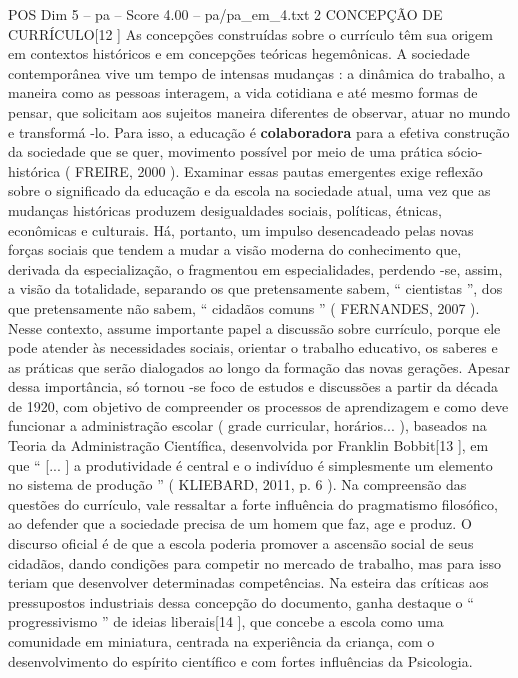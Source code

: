 \begin{textsample}{POS Dim 5 – pa – Score 4.00 – pa/pa\_em\_4.txt}  \label{ex:f5_pos_246}
2 CONCEPÇÃO DE CURRÍCULO[12 ] As concepções construídas sobre o currículo têm sua origem em contextos históricos e em concepções teóricas hegemônicas.
A sociedade contemporânea vive um tempo de intensas mudanças : a dinâmica do trabalho, a maneira como as pessoas interagem, a vida cotidiana e até mesmo formas de pensar, que solicitam aos sujeitos maneira diferentes de observar, atuar no mundo e transformá -lo.
Para isso, a educação é \textbf{colaboradora} para a efetiva construção da sociedade que se quer, movimento possível por meio de uma prática sócio-histórica ( FREIRE, 2000 ).
Examinar essas pautas emergentes exige reflexão sobre o significado da educação e da escola na sociedade atual, uma vez que as mudanças históricas produzem desigualdades sociais, políticas, étnicas, econômicas e culturais.
Há, portanto, um impulso desencadeado pelas novas forças sociais que tendem a mudar a visão moderna do conhecimento que, derivada da especialização, o fragmentou em especialidades, perdendo -se, assim, a visão da totalidade, separando os que pretensamente sabem, “ cientistas ”, dos que pretensamente não sabem, “ cidadãos comuns ” ( FERNANDES, 2007 ).
Nesse contexto, assume importante papel a discussão sobre currículo, porque ele pode atender às necessidades sociais, orientar o trabalho educativo, os saberes e as práticas que serão dialogados ao longo da formação das novas gerações.
Apesar dessa importância, só tornou -se foco de estudos e discussões a partir da década de 1920, com objetivo de compreender os processos de aprendizagem e como deve funcionar a administração escolar ( grade curricular, horários... ), baseados na Teoria da Administração Científica, desenvolvida por Franklin Bobbit[13 ], em que “ [... ] a produtividade é central e o indivíduo é simplesmente um elemento no sistema de produção ” ( KLIEBARD, 2011, p. 6 ).
Na compreensão das questões do currículo, vale ressaltar a forte influência do pragmatismo filosófico, ao defender que a sociedade precisa de um homem que faz, age e produz.
O discurso oficial é de que a escola poderia promover a ascensão social de seus cidadãos, dando condições para competir no mercado de trabalho, mas para isso teriam que desenvolver determinadas competências.
Na esteira das críticas aos pressupostos industriais dessa concepção do documento, ganha destaque o “ progressivismo ” de ideias liberais[14 ], que concebe a escola como uma comunidade em miniatura, centrada na experiência da criança, com o desenvolvimento do espírito científico e com fortes influências da Psicologia.

\end{textsample}
